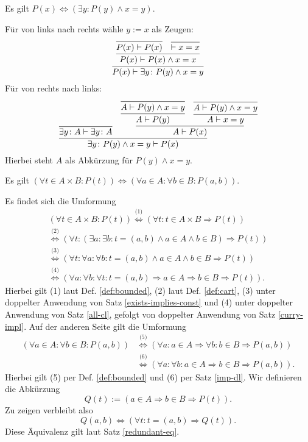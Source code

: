 \begin{Satz}\label{eq-substitution}
Es gilt $P(x)\iff (\exists y\colon P(y)\land x=y)$.
\end{Satz}
\begin{Beweis}
Für von links nach rechts wähle $y:=x$ als Zeugen:
\[
\infer{P(x)\vdash\exists y\colon P(y)\land x=y}{
  \infer{P(x)\vdash P(x)\land x=x}{
    \infer{P(x)\vdash P(x)}{}
  & \infer{\vdash x=x}{}}}
\]
Für von rechts nach links:
\[
\infer{\exists y\colon P(y)\land x=y\vdash P(x)}{
  \infer{\exists y\colon A\vdash\exists y\colon A}{}
& \infer{A\vdash P(x)}{
    \infer{A\vdash P(y)}{
      \infer{A\vdash P(y)\land x=y}{}}
  & \infer{A\vdash x=y}{
      \infer{A\vdash P(y)\land x=y}{}}}}
\]
Hierbei steht $A$ als Abkürzung für $P(y)\land x=y$.\,\qedsymbol
\end{Beweis}

\begin{Satz}\label{all-cart}
Es gilt
$(\forall t \in A{\times}B\colon P(t))
\Leftrightarrow (\forall a{\in}A\colon\forall b{\in}B\colon P(a,b))$.
\end{Satz}

\begin{Beweis}
Es findet sich die Umformung
\begin{gather*}
(\forall t \in A{\times}B\colon P(t))
\stackrel{\text{(1)}}{\iff} (\forall t\colon t\in A\times B\Rightarrow P(t))\\
\stackrel{\text{(2)}}{\iff}
(\forall t\colon (\exists a\colon\exists b\colon t=(a,b)\land a\in A\land b\in B)\Rightarrow P(t))\\
\stackrel{\text{(3)}}{\iff}
(\forall t\colon\forall a\colon\forall b\colon t=(a,b)\land a\in A\land b\in B\Rightarrow P(t))\\
\stackrel{\text{(4)}}{\iff}
(\forall a\colon\forall b\colon\forall t\colon t=(a,b)\Rightarrow a\in A\Rightarrow b\in B\Rightarrow P(t)).
\end{gather*}
Hierbei gilt (1) laut Def. \ref{def:bounded}, (2) laut Def. \ref{def:cart},
(3) unter doppelter Anwendung von Satz \ref{exists-implies-const}
und (4) unter doppelter Anwendung von Satz \ref{all-cl}, gefolgt
von doppelter Anwendung von Satz \ref{curry-impl}.
Auf der anderen Seite gilt die Umformung
\begin{align*}
(\forall a{\in}A\colon\forall b{\in}B\colon P(a,b))
&\stackrel{\text{(5)}}{\iff}
(\forall a\colon a\in A\Rightarrow\forall b\colon b\in B\Rightarrow P(a,b))\\
&\stackrel{\text{(6)}}{\iff}
(\forall a\colon\forall b\colon a\in A\Rightarrow b\in B\Rightarrow P(a,b)).
\end{align*}
Hierbei gilt (5) per Def. \ref{def:bounded} und (6) per Satz \ref{imp-dl}.
Wir definieren die Abkürzung
\[Q(t) := (a\in A\Rightarrow b\in B\Rightarrow P(t)).\]
Zu zeigen verbleibt also
\[Q(a,b)\iff (\forall t\colon t=(a,b)\Rightarrow Q(t)).\]
Diese Äquivalenz gilt laut Satz \ref{redundant-eq}.\,\qedsymbol
\end{Beweis}

